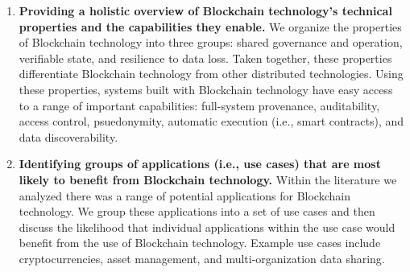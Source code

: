 \begin{enumerate}
	\item \textbf{Providing a holistic overview of Blockchain technology's technical properties and the capabilities they enable.}
	We organize the properties of Blockchain technology into three groups: shared governance and operation, verifiable state, and resilience to data loss.
	Taken together, these properties differentiate Blockchain technology from other distributed technologies.
	Using these properties, systems built with Blockchain technology have easy access to a range of important capabilities: full-system provenance, auditability, access control, psuedonymity, automatic execution (i.e., smart contracts), and data discoverability.
	
	
	
	\item \textbf{Identifying groups of applications (i.e., use cases) that are most likely to benefit from Blockchain technology.}
	Within the literature we analyzed there was a range of potential applications for Blockchain technology.
	We group these applications into a set of use cases and then discuss the likelihood that individual applications within the use case would benefit from the use of Blockchain technology.
	Example use cases include cryptocurrencies, asset management, and multi-organization data sharing.
	

\end{enumerate}

